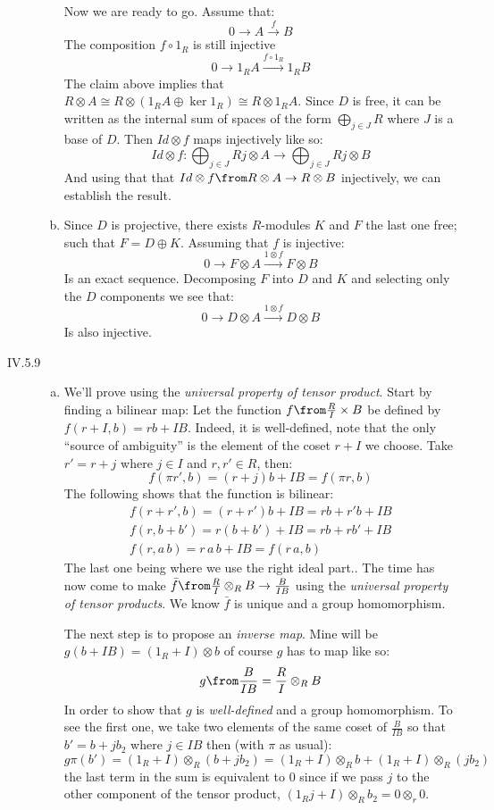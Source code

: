 \begin{description}
\begin{enumerate}[(a)]
            Now we are ready to go. Assume that:
            $$0\to A \xrightarrow{f} B$$
            The composition $f\circ 1_R$ is still injective
            $$0\to 1_RA \xrightarrow{f\circ 1_R} 1_RB$$
            The claim above implies that $R\otimes A\cong R\otimes(1_RA\oplus \ker 1_R)\cong R\otimes 1_R A$. Since $D$ is free, it can be written as the internal sum of spaces of the form $\bigoplus_{j\in J} R$ where $J$ is a base of $D$. Then $Id\otimes f$ maps injectively like so:
            $$Id\otimes f : \bigoplus_{j\in J} Rj\otimes A \to \bigoplus_{j\in J} Rj\otimes B$$
            And using that  that $Id\otimes f\from R\otimes A \to R\otimes B$ injectively, we can establish the result.
        \item Since $D$ is projective, there exists $R$-modules $K$ and $F$ the last one free; such that $F= D\oplus K$. Assuming that $f$ is injective:
            $$0\to F\otimes A \xrightarrow{1\otimes f} F\otimes B$$
            Is an exact sequence. Decomposing $F$ into $D$ and $K$ and selecting only the $D$ components we see that:
            $$0\to D\otimes A \xrightarrow{1\otimes f} D\otimes B$$
            Is also injective.
    \end{enumerate}
\item[IV.5.9]
    \begin{enumerate}[(a)]
        \item We'll prove using the \emph{universal property of tensor product}. Start by finding a bilinear map:
            Let the function $f\from \frac RI \times B$ be defined by $f(r+I,b) = rb + IB$. 
            Indeed, it is well-defined, note that the only ``source of ambiguity'' is the element of the coset $r+I$ we choose. Take $r'= r+j$ where $j\in I$ and $r,r'\in R$, then:
            $$f(\pi r',b) = (r+j)b + IB = f(\pi r,b)$$
            The following  shows that the function is bilinear:
            \begin{gather*}
                f(r+r',b) = (r+r')b +IB = rb+r'b +IB\\
                f(r,b+b') = r(b+b') +IB = rb+rb' +IB\\
                f(r,a\, b) = r\, a\, b +IB = f(r\, a, b) 
            \end{gather*}
 The last one  being  where we use the right ideal part.. The time has now come to make $\bar f \from \frac RI\otimes_R B \to \frac B{IB}$ using  the \emph{universal property of tensor products}. We know $\bar f$ is unique and a group homomorphism.

            The next step is to propose an \emph{inverse map}. Mine will be $g(b+IB) = (1_R+I)\otimes b$ of course $g$ has to map like so:
            $$g\from \frac B{IB} = \frac RI\otimes_R B$$
            In order to show that $g$ is \emph{well-defined} and a group homomorphism. To see the first one, we take two elements of the same coset of $\frac B{IB}$ so that $b'=b+jb_2$ where $j\in IB$ then (with $\pi$ as usual):
            $$g\pi(b') = (1_R+I)\otimes_R (b+jb_2) = (1_R+I)\otimes_R b +(1_R+I)\otimes_R(jb_2)$$
            the last term in the sum is equivalent to 0 since if we pass $j$ to the other component of the tensor product, $(1_Rj+I)\otimes_R b_2=0\otimes_r 0$.


\end{enumerate}
\end{description}
